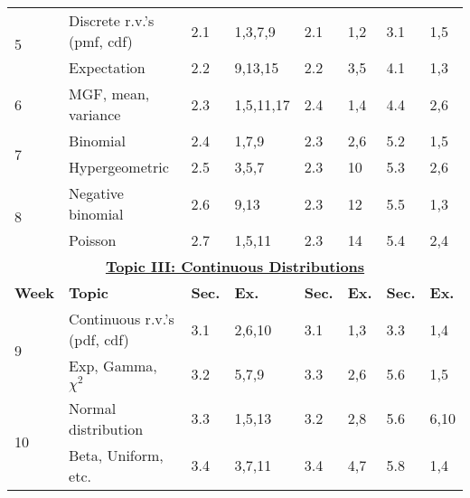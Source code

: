 \documentclass[12pt]{article}
\begin{document}
\begin{landscape}
\begin{table}[htbp]
\begin{tabular}{%
    p{1.2cm}   %
    p{5cm}     %
    p{1cm}p{4cm}  %
    p{1cm}p{3.2cm}  %
    p{1cm}p{2.7cm}  %
}
\multirow{2}{*}{5} &
Discrete r.v.’s (pmf, cdf)      & 2.1       & 1,3,7,9       & 2.1       & 1,2       & 3.1       & 1,5\\[2pt]
& Expectation                   & 2.2       & 9,13,15       & 2.2       & 3,5       & 4.1       & 1,3\\[10pt]
    
6 & MGF, mean, variance         & 2.3       & 1,5,11,17     & 2.4       & 1,4       & 4.4       & 2,6\\[10pt]
    
\multirow{2}{*}{7}
    & Binomial                  & 2.4       & 1,7,9         & 2.3       & 2,6       & 5.2       & 1,5\\[2pt]
    & Hypergeometric            & 2.5       & 3,5,7         & 2.3       & 10        & 5.3       & 2,6\\[10pt]
    
\multirow{2}{*}{8}
    & Negative binomial         & 2.6       & 9,13          & 2.3       & 12        & 5.5       & 1,3\\[2pt]
    & Poisson                   & 2.7       & 1,5,11        & 2.3       & 14        & 5.4       & 2,4\\[2pt]
\midrule
\multicolumn{8}{c}{\textbf{\underline{Topic III: Continuous Distributions}}}\\[2pt]
\textbf{Week}   &
\textbf{Topic}  &
\textbf{Sec.}   & \textbf{Ex.} &
\textbf{Sec.}   & \textbf{Ex.} &
\textbf{Sec.}   & \textbf{Ex.}\\
\midrule
\multirow{2}{*}{9} &
Continuous r.v.’s (pdf, cdf)    & 3.1       & 2,6,10        & 3.1       & 1,3     & 3.3       & 1,4\\[2pt]
& Exp, Gamma, $\chi^{2}$        & 3.2       & 5,7,9         & 3.3       & 2,6     & 5.6       & 1,5\\[10pt]

\multirow{2}{*}{10} &
    Normal distribution         & 3.3       & 1,5,13        & 3.2       & 2,8     & 5.6       & 6,10\\[2pt]
    & Beta, Uniform, etc.       & 3.4       & 3,7,11        & 3.4       & 4,7     & 5.8       & 1,4\\[2pt]
\bottomrule
\end{tabular}
\end{table}
\end{landscape}
\end{document}
